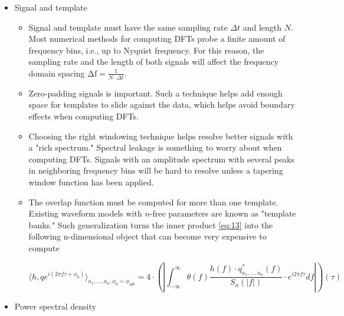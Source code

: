 \begin{itemize}

\item Signal and template
	\begin{itemize}
	
	\item Signal and template must have the same sampling rate $\Delta t$ and length $N$. Most numerical methods for computing DFTs probe a finite amount of frequency bins, i.e., up to Nyquist frequency. For this reason, the sampling rate and the length of both signals will affect the frequency domain spacing $\mathrm{\Delta f}=\frac{1}{N\cdot \Delta t}$.
	
	\item Zero-padding signals is important. Such a technique helps add enough space for templates to slide against the data, which helps avoid boundary effects when computing DFTs.
	\item Choosing the right windowing technique helps resolve better signals with a "rich spectrum." Spectral leakage is something to worry about when computing DFTs. Signals with an amplitude spectrum with several peaks in neighboring frequency bins will be hard to resolve unless a tapering window function has been applied.
	
	\item The overlap function must be computed for more than one template. Existing waveform models with $n$-free parameters are known as "template banks." Such generalization turns the inner product \ref{eq:13} into the following n-dimensional object that can become very expensive to compute
	
\begin{equation}\label{inn}
\langle h,q e^{i(2\pi f \tau + \phi_0)} \rangle_{a_1, ..., a_n,\phi_0=\phi_{opt}} =4\cdot \left( \left| \int_{-\infty}^{\infty} \theta(f)\frac{h(f) \cdot q^{*}_{a_1, ..., a_n}(f) }{S_n(|f|)} \cdot e^{i 2\pi f \tau} df \right| \right)(\tau)
\end{equation}

	\end{itemize}
	
\item Power spectral density
	\begin{itemize}
	

\end{itemize}
\end{itemize}
